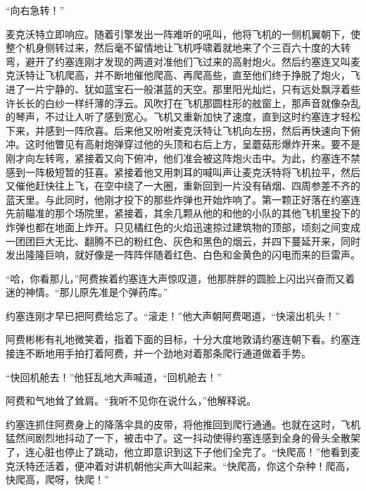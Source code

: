     “向右急转！”

    麦克沃特立即响应。随着引擎发出一阵难听的吼叫，他将飞机的一侧机翼朝下，使整个机身侧转过来，然后毫不留情地让飞机呼啸着就地来了个三百六十度的大转弯，避开了约塞连刚才发现的两道对准他们飞过来的高射炮火。然后约塞连又叫麦克沃特让飞机爬高，并不断地催他爬高、再爬高些，直至他们终于挣脱了炮火，飞进了一片宁静的、犹如蓝宝石一般湛蓝的天空。那里阳光灿烂，只有远处飘浮着些许长长的白纱一样纤薄的浮云。风吹打在飞机那圆柱形的舷窗上，那声音就像杂乱的琴声，不过让人听了感到宽心。飞机又重新加快了速度，直到这时约塞连才轻松下来，并感到一阵欣喜。后来他又吩咐麦克沃特让飞机向左拐，然后再快速向下俯冲。这时他瞥见有高射炮弹穿过他的头顶和右后上方，呈蘑菇形爆炸开来。要不是刚才向左转弯，紧接着又向下俯冲，他们准会被这阵炮火击中。为此，约塞连不禁感到一阵极短暂的狂喜。紧接着他又用刺耳的喊叫声让麦克沃特将飞机拉平，然后又催他赶快往上飞，在空中绕了一大圈，重新回到一片没有硝烟、四周参差不齐的蓝天里。与此同时，他刚才投下的那些炸弹也开始炸响了。第一颗正好落在约塞连先前瞄准的那个场院里，紧接着，其余几颗从他的和他的小队的其他飞机里投下的炸弹也都在地面上炸开。只见橘红色的火焰迅速掠过建筑物的顶部，顷刻之间变成一团团巨大无比、翻腾不已的粉红色、灰色和黑色的烟云，并四下蔓延开来，同时发出隆隆巨响，就好像是一阵阵伴随着红色、白色和金黄色的闪电而来的巨雷声。

    “哈，你看那儿，”阿费挨着约塞连大声惊叹道，他那胖胖的圆脸上闪出兴奋而又着迷的神情。“那儿原先准是个弹药库。”

    约塞连刚才早已把阿费给忘了。“滚走！”他大声朝阿费喝道，“快滚出机头！”

    阿费彬彬有礼地微笑着，指着下面的目标，十分大度地敦请约塞连朝下看。约塞连接连不断地用手拍打着阿费，并一个劲地对着那条爬行通道做着手势。

    “快回机舱去！”他狂乱地大声喊道，“回机舱去！”

    阿费和气地耸了耸肩。“我听不见你在说什么，”他解释说。

    约塞连抓住阿费身上的降落伞具的皮带，将他推回到爬行通通。也就在这时，飞机猛然间剧烈地抖动了一下，被击中了。这一抖动使得约塞连感到全身的骨头全散架了，连心脏也停止了跳动，他立即意识到这下子他们全完了。“快爬高！”他看到麦克沃特还活着，便冲着对讲机朝他尖声大叫起来。“快爬高，你这个杂种！爬高，快爬高，爬呀，快爬！”

